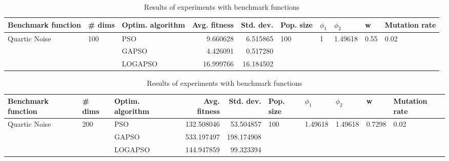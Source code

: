 \documentclass{article}
\begin{document}
\begin{table}
\centering
\caption{Results of experiments with benchmark functions}
\begin{tabular}{lllrrlllll}
\toprule
            Benchmark function &              \# dims & Optim. algorithm &  Avg. fitness &  Std. dev. &            Pop. size &         $\phi_{1}$ &               $\phi_{2}$ &                     w &         Mutation rate \\
\midrule
\multirow{3}{*}{Quartic Noise} & \multirow{3}{*}{100} &              PSO &      9.660628 &   6.515865 & \multirow{3}{*}{100} & \multirow{3}{*}{1} & \multirow{3}{*}{1.49618} & \multirow{3}{*}{0.55} & \multirow{3}{*}{0.02} \\
                               &                      &            GAPSO &      4.426091 &   0.517280 &                      &                    &                          &                       &                       \\
                               &                      &          LOGAPSO &     16.999766 &  16.184502 &                      &                    &                          &                       &                       \\
\bottomrule
\end{tabular}
\end{table}
\begin{table}
\centering
\caption{Results of experiments with benchmark functions}
\begin{tabular}{lllrrlllll}
\toprule
            Benchmark function &              \# dims & Optim. algorithm &  Avg. fitness &  Std. dev. &            Pop. size &               $\phi_{1}$ &               $\phi_{2}$ &                       w &         Mutation rate \\
\midrule
\multirow{3}{*}{Quartic Noise} & \multirow{3}{*}{200} &              PSO &    132.508046 &  53.504857 & \multirow{3}{*}{100} & \multirow{3}{*}{1.49618} & \multirow{3}{*}{1.49618} & \multirow{3}{*}{0.7298} & \multirow{3}{*}{0.02} \\
                               &                      &            GAPSO &    533.197497 & 198.174908 &                      &                          &                          &                         &                       \\
                               &                      &          LOGAPSO &    144.947859 &  99.323394 &                      &                          &                          &                         &                       \\
\bottomrule
\end{tabular}
\end{table}
\end{document}

